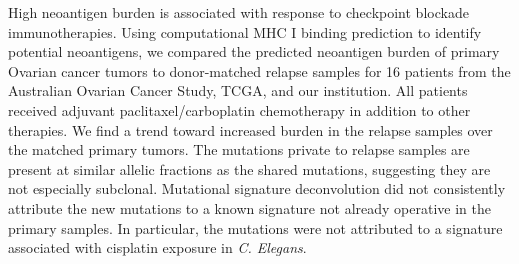 High neoantigen burden is associated with response to checkpoint blockade immunotherapies. Using computational MHC I binding prediction to identify potential neoantigens, we compared the predicted neoantigen burden of primary Ovarian cancer tumors to donor-matched relapse samples for 16 patients from the Australian Ovarian Cancer Study, TCGA, and our institution. All patients received adjuvant paclitaxel/carboplatin chemotherapy in addition to other therapies. We find a trend toward increased burden in the relapse samples over the matched primary tumors. The mutations private to relapse samples are present at similar allelic fractions as the shared mutations, suggesting they are not especially subclonal. Mutational signature deconvolution did not consistently attribute the new mutations to a known signature not already operative in the primary samples. In particular, the mutations were not attributed to a signature associated with cisplatin exposure in \textit{C. Elegans}.

